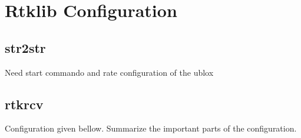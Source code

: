\chapter{Rtklib Configuration}\label{APPENDIX:RTKLIB}

\section{str2str}
Need start commando and rate configuration of the ublox

\section{rtkrcv}
Configuration given bellow. Summarize the important parts of the configuration.
